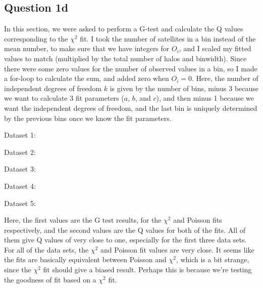 \subsection{Question 1d}

In this section, we were asked to perform a G-test and calculate the Q values corresponding to the $\chi^2$ fit. 
I took the number of satellites in a bin instead of the mean number, to make sure that we have integers for $O_i$, and I scaled my fitted values to match (multiplied by the total number of halos and binwidth).
Since there were some zero values for the number of observed values in a bin, so I made a for-loop to calculate the sum, and added zero when $O_i = 0$.
Here, the number of independent degrees of freedom $k$ is given by the number of bins, minus 3 because we want to calculate 3 fit parameters ($a$, $b$, and $c$), and then minus 1 because we want the independent degrees of freedom, and the last bin is uniquely determined by the previous bins once we know the fit parameters.

Dataset 1:

Dataset 2:

Dataset 3:

Dataset 4:

Dataset 5:


Here, the first values are the G test results, for the $\chi^2$ and Poisson fits respectively, and the second values are the Q values for both of the fits.
All of them give Q values of very close to one, especially for the first three data sets. 
For all of the data sets, the $\chi^2$ and Poisson fit values are very close.
It seems like the fits are basically equivalent between Poisson and $\chi^2$, which is a bit strange, since the $\chi^2$ fit should give a biased result. 
Perhaps this is because we're testing the goodness of fit based on a $\chi^2$ fit.

